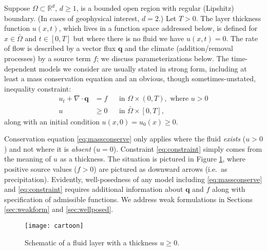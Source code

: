 \documentclass[final,leqno,onefignum,onetabnum]{siamltex1213bueler}
\newcommand\bq{\mathbf{q}}
\newcommand{\Div}{\nabla\cdot}
\newcommand\RR{\mathbb{R}}
\begin{document}
Suppose $\Omega \subset \RR^d$, $d\ge 1$, is a bounded open region with regular (Lipshitz) boundary.  (In cases of geophysical interest, $d=2$.)  Let $T>0$.  The layer thickness function $u(x,t)$, which lives in a function space addressed below, is defined for $x\in \bar\Omega$ and $t \in [0,T]$ but where there is no fluid we have $u(x,t)=0$.  The rate of flow is described by a vector flux $\bq$ and the climate (addition/removal processes) by a source term $f$; we discuss parameterizations below.  The time-dependent models we consider are usually stated in strong form, including at least a mass conservation equation and an obvious, though sometimes-unstated, inequality constraint:
\begin{align}
u_t + \Div \bq &= f &&\text{in } \Omega \times (0,T), \text{ where } u > 0 \label{eq:massconserve} \\
u &\ge 0 &&\text{in } \bar\Omega \times [0,T], \label{eq:constraint}
\end{align}
along with an initial condition $u(x,0)=u_0(x)\ge 0$.

Conservation equation \eqref{eq:massconserve} only applies where the fluid \emph{exists} ($u>0$) and not where it is \emph{absent} ($u=0$).  Constraint \eqref{eq:constraint} simply comes from the meaning of $u$ as a thickness.  The situation is pictured in Figure \ref{fig:cartoon}, where positive source values ($f>0$) are pictured as downward arrows (i.e.~as precipitation).  Evidently, well-posedness of any model including \eqref{eq:massconserve} and \eqref{eq:constraint} requires additional information about $\bq$ and $f$ along with specification of admissible functions.  We address weak formulations in Sections \ref{sec:weakform} and \ref{sec:wellposed}.

\begin{figure}[ht]
\centerline{\texttt{[image: cartoon]}}
\caption{Schematic of a fluid layer with a thickness $u\ge 0$.}
\label{fig:cartoon}
\end{figure}
\end{document}

